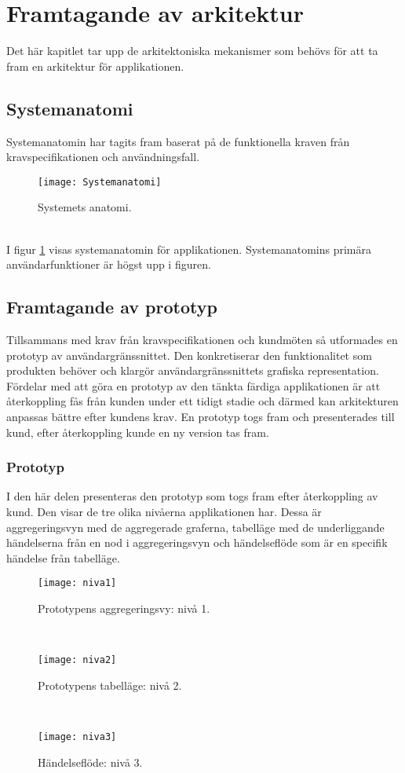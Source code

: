 \section{Framtagande av arkitektur}
Det här kapitlet tar upp de arkitektoniska mekanismer som behövs för att ta fram en arkitektur för applikationen.
\subsection{Systemanatomi}
Systemanatomin har tagits fram baserat på de funktionella kraven från kravspecifikationen och användningsfall.
\begin{figure}[h]
    \centering
    \texttt{[image: Systemanatomi]}
    \caption{Systemets anatomi.}
    \label{fig:systemanatomi}
\end{figure}
\ \\
I figur \ref{fig:systemanatomi} visas systemanatomin för applikationen. Systemanatomins primära användarfunktioner är högst upp i figuren.
\subsection{Framtagande av prototyp}
Tillsammans med krav från kravspecifikationen och kundmöten så utformades en prototyp av användargränssnittet. Den konkretiserar den funktionalitet som produkten behöver och klargör användargränssnittets grafiska representation. Fördelar med att göra en prototyp av den tänkta färdiga applikationen är att återkoppling fås från kunden under ett tidigt stadie och därmed kan arkitekturen anpassas bättre efter kundens krav. En prototyp togs fram och presenterades till kund, efter återkoppling kunde en ny version tas fram. 
\newpage
\subsubsection{Prototyp}
I den här delen presenteras den prototyp som togs fram efter återkoppling av kund. Den visar de tre olika nivåerna applikationen har. Dessa är aggregeringsvyn med de aggregerade graferna, tabelläge med de underliggande händelserna från en nod i aggregeringsvyn och händelseflöde som är en specifik händelse från tabelläge.
\begin{figure}[h]
    \centering
    \texttt{[image: niva1]}
    \caption{Prototypens aggregeringsvy: nivå 1.}
    \label{fig:architectuarl_prototype1}
\end{figure}
\ \\
\begin{figure}[h]
    \centering
    \texttt{[image: niva2]}
    \caption{Prototypens tabelläge: nivå 2.}
    \label{fig:architectuarl_prototype2}
\end{figure}
\ \\
\begin{figure}[h]
    \centering
    \texttt{[image: niva3]}
    \caption{Händelseflöde: nivå 3.}
    \label{fig:architectuarl_prototype3}
\end{figure}
\ \\
\newpage
